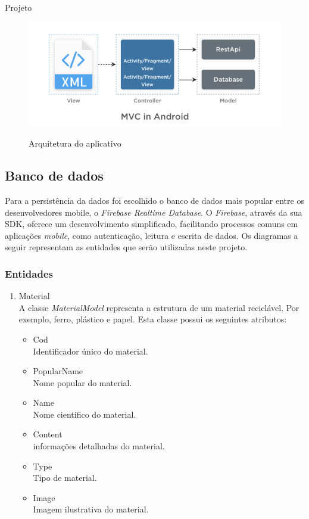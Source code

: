 \documentclass[
	12pt,				%
	openright,			%
	twoside,			%
	a4paper,			%
	english,			%
	french,				%
	spanish,			%
	brazil				%
	]{abntex2}
\begin{document}
\begin{chapter}{Projeto}
\begin{figure}[h]
\centering
   \caption{Arquitetura do aplicativo}
   \includegraphics[scale=0.40]{media/MVC.png}
     \label{fig:arquitetura_mvc}
\end{figure}


\subsection{Banco de dados}
Para a persistência da dados foi escolhido o banco de dados mais popular entre os desenvolvedores mobile, o \textit{Firebase Realtime Database}. O \textit{Firebase}, através da sua SDK, oferece um desenvolvimento simplificado, facilitando processos comuns em aplicações \textit{mobile}, como autenticação, leitura e escrita de dados.
 Os diagramas a seguir representam as entidades que serão utilizadas neste projeto.


\subsubsection{Entidades}
\begin{enumerate}
 \item{Material} \\ A classe \textit{MaterialModel} representa a estrutura de um material reciclável. Por exemplo, ferro, plástico e papel. Esta classe possui os seguintes atributos:
 
 \begin{itemize}
  \item{Cod}\\ Identificador único do material.
   \item{PopularName}\\ Nome popular do material.
     \item{Name}\\ Nome cientifico do material.
       \item{Content}\\ informações detalhadas do material.
         \item{Type}\\ Tipo de material.
           \item{Image}\\ Imagem ilustrativa do material.
\end{itemize}
  

\end{enumerate}
\end{chapter}
\end{document}
